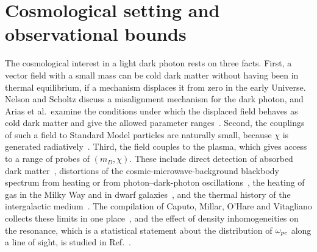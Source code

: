 \section{Cosmological setting and observational bounds}\label{sec:cosmo}

The cosmological interest in a light dark photon rests on three facts. First, a vector field with a small mass can be cold dark matter without having been in thermal equilibrium, if a mechanism displaces it from zero in the early Universe. Nelson and Scholtz discuss a misalignment mechanism for the dark photon, and Arias et al.\ examine the conditions under which the displaced field behaves as cold dark matter and give the allowed parameter ranges~\citep{NelsonScholtz2011,Arias2012}. Second, the couplings of such a field to Standard Model particles are naturally small, because $\chi$ is generated radiatively~\citep{Holdom1986}. Third, the field couples to the plasma, which gives access to a range of probes of $(m_D,\chi)$. These include direct detection of absorbed dark matter~\citep{Pospelov2008}, distortions of the cosmic-microwave-background blackbody spectrum from heating or from photon--dark-photon oscillations~\citep{Mirizzi2009,Fixsen1996}, the heating of gas in the Milky Way and in dwarf galaxies~\citep{DubovskyHC2015}, and the thermal history of the intergalactic medium~\citep{McDermottWitte2020,Witte2020}. The compilation of Caputo, Millar, O'Hare and Vitagliano collects these limits in one place~\citep{CaputoHandbook2021}, and the effect of density inhomogeneities on the resonance, which is a statistical statement about the distribution of $\omega_{pe}$ along a line of sight, is studied in Ref.~\citep{CaputoInhom2020}.

